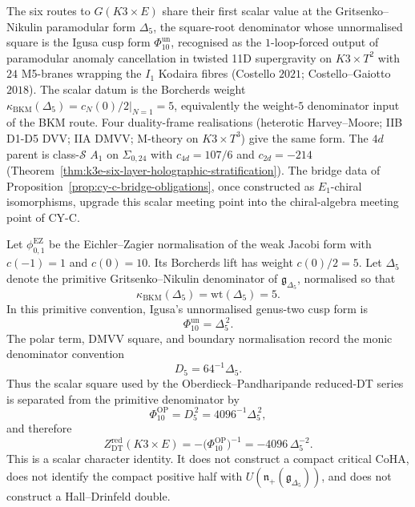\begin{remark}
\label{rem:cy-c-six-routes-one-loop}
The six routes to $G(K3\times E)$ share their first scalar
value at the
Gritsenko--Nikulin paramodular form $\Delta_5$, the square-root
denominator whose unnormalised square is the Igusa cusp form
\(\Phi_{10}^{\mathrm{un}}\), recognised as the
$1$-loop-forced output of paramodular anomaly cancellation in twisted
11D supergravity on $K3\times T^2$ with $24$ M5-branes wrapping the
$I_1$ Kodaira fibres (Costello $2021$; Costello--Gaiotto $2018$).
The scalar datum is the Borcherds weight
$\kappa_{\mathrm{BKM}}(\Delta_5)=\left.c_N(0)/2\right|_{N=1}=5$, equivalently the
weight-$5$ denominator input of the BKM route. Four duality-frame
realisations (heterotic Harvey--Moore; IIB D1-D5 DVV; IIA DMVV;
M-theory on $K3\times T^3$) give the same form. The $4d$ parent is
class-$\mathcal{S}$ $A_1$ on $\Sigma_{0,24}$ with
$c_{4d}=107/6$ and $c_{2d}=-214$
(Theorem~\ref{thm:k3e-six-layer-holographic-stratification}). The
bridge data of Proposition~\ref{prop:cy-c-bridge-obligations}, once
constructed as \(E_1\)-chiral isomorphisms, upgrade this scalar meeting
point into the chiral-algebra meeting point of CY-C.
\end{remark}

\begin{proposition}
\label{prop:cy-c-op-igusa-scalar-separation}
Let \(\phi_{0,1}^{\mathrm{EZ}}\) be the Eichler--Zagier normalisation of
the weak Jacobi form with \(c(-1)=1\) and \(c(0)=10\). Its Borcherds
lift has weight \(c(0)/2=5\). Let \(\Delta_5\) denote the primitive
Gritsenko--Nikulin denominator of \(\mathfrak g_{\Delta_5}\), normalised
so that
\[
 \kappa_{\mathrm{BKM}}(\Delta_5)=\mathrm{wt}(\Delta_5)=5.
\]
In this primitive convention, Igusa's unnormalised genus-two cusp form is
\[
 \Phi_{10}^{\mathrm{un}}=\Delta_5^{\,2}.
\]
The polar term, DMVV square, and boundary normalisation record the monic
denominator convention
\[
 D_5=64^{-1}\Delta_5.
\]
Thus the scalar square used by the Oberdieck--Pandharipande reduced-DT
series is separated from the primitive denominator by
\[
 \Phi_{10}^{\mathrm{OP}}=D_5^{\,2}=4096^{-1}\Delta_5^{\,2},
\]
and therefore
\[
 Z^{\mathrm{red}}_{\mathrm{DT}}(K3\times E)
 =
 -\bigl(\Phi_{10}^{\mathrm{OP}}\bigr)^{-1}
 =
 -4096\,\Delta_5^{-2}.
\]
This is a scalar character identity. It does not construct a compact
critical CoHA, does not identify the compact positive half with
\(U(\mathfrak n_+(\mathfrak g_{\Delta_5}))\), and does not construct a
Hall--Drinfeld double.
\end{proposition}

